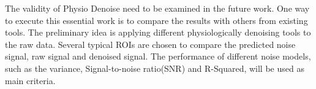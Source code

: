 The validity of Physio Denoise need to be examined in the future work.
One way to execute this essential work is to compare the results with others from existing tools.
The preliminary idea is applying different physiologically denoising tools to the raw data.
Several typical ROIs are chosen to compare the predicted noise signal, raw signal and denoised signal.
The performance of different noise models, such as
the variance, Signal-to-noise ratio(SNR) and R-Squared, will be used as main criteria.